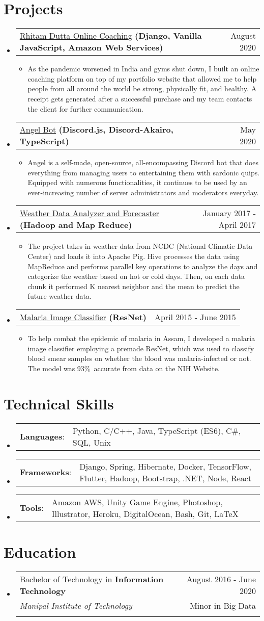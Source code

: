 \documentclass[letterpaper,11pt]{article}
\makeatletter
\newcommand{\sectionStart}{
  \begin{itemize}[label={},leftmargin=0in]
}
\newcommand{\sectionEnd}{
  \end{itemize}
}
\newcommand{\educationItem}[5]{
  \vspace{-1pt}
  \item
  \begin{tabular*}{\textwidth}{l@{\extracolsep{\fill}}r@{}}
    {#1 in \textbf{#2}}  & {#3}\\
    {\textit{#4}} & {#5}\\\vspace{-18pt}
  \end{tabular*}
  \vspace{-5pt}
}
\newcommand{\skillItem}[2]{
  \vspace{-1pt}
  \item
  \begin{tabular*}{1.0\textwidth}{l@{}l@{}}
    {\textbf{#1}: } & {#2}
  \end{tabular*}\vspace{-17pt}
}
\newcommand{\projectHeading}[4]{
  \vspace{-1pt}
  \item
  \begin{tabular*}{1.0\textwidth}{l@{\extracolsep{\fill}}r@{}}
    \normalsize{{\href{#1}{#2}} \textbf{#3}} & #4 \\
  \end{tabular*}\vspace{-5pt}
}
\newcommand{\listStart}{\begin{itemize}}
\newcommand{\listEnd}{\end{itemize}\vspace{-5pt}}
\newcommand{\bulletItem}[1]{
  \item
  \small{
    {#1 \vspace{-1.8pt}}
  }
}
\makeatother
\begin{document}
\section{Projects}
\sectionStart
  \projectHeading
    {https://rhitamdutta.com/coaching/}
    {Rhitam Dutta Online Coaching}
    {(Django, Vanilla JavaScript, Amazon Web Services)}
    {August 2020}
  \listStart
    \bulletItem
      {As the pandemic worsened in India and gyms shut down, I built an online coaching platform on top of my portfolio website that allowed me to help people from all around the world be strong, physically fit, and healthy. A receipt gets generated after a successful purchase and my team contacts the client for further communication.}
  \listEnd
  \projectHeading
    {https://github.com/exthazor/angel}
    {Angel Bot}
    {(Discord.js, Discord-Akairo, TypeScript)}
    {May 2020}
  \listStart
    \bulletItem
    {Angel is a self-made, open-source, all-encompassing Discord bot that does everything from managing users to entertaining them with sardonic quips. Equipped with numerous functionalities, it continues to be used by an ever-increasing number of server administrators and moderators everyday.}
  \listEnd
  \projectHeading
    {https://drive.google.com/file/d/12v8wYAPJ4aZ6rGTGNL5RerHWSN13arj5/view?usp=sharing}
    {Weather Data Analyzer and Forecaster}
    {(Hadoop and Map Reduce)}
    {January 2017 - April 2017}
  \listStart
    \bulletItem
      {The project takes in weather data from NCDC (National Climatic Data Center) and loads it into Apache Pig. Hive processes the data using MapReduce and performs parallel key operations to analyze the days and categorize the weather based on hot or cold days. Then, on each data chunk it performed K nearest neighbor and the mean to predict the future weather data.}
  \listEnd
  \projectHeading
    {}
    {Malaria Image Classifier}
    {(ResNet)}
    {April 2015 - June 2015}
  \listStart
    \bulletItem
      {To help combat the epidemic of malaria in Assam, I developed a malaria image classifier employing a premade ResNet, which was used to classify blood smear samples on whether the blood was malaria-infected or not. The model was 93\%\ accurate from data on the NIH Website.}
  \listEnd
\sectionEnd

\section{Technical Skills}
\sectionStart
  \skillItem
    {Languages}
    {Python, C/C++, Java, TypeScript (ES6), C\#, SQL, Unix}
  \skillItem
    {Frameworks}
    {Django, Spring, Hibernate, Docker, TensorFlow, Flutter, Hadoop, Bootstrap, .NET, Node, React}
  \skillItem
    {Tools}
    {Amazon AWS, Unity Game Engine, Photoshop, Illustrator, Heroku, DigitalOcean, Bash, Git, \LaTeX\ }
  \vspace{3pt}
\sectionEnd

\section{Education}
\sectionStart
  \educationItem
    {Bachelor of Technology} 
    {Information Technology} 
    {August 2016 - June 2020}
    {Manipal Institute of Technology} 
    {Minor in Big Data}
\sectionEnd
\end{document}
